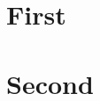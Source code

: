 \documentclass{article}
\begin{document}
\section{First}\label{sec:duplicate}
\section{Second}\label{sec:duplicate}
\end{document}
